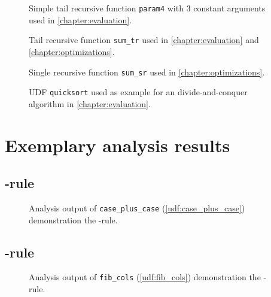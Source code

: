 \begin{figure}[h!]
    \centering
    
    \caption{Simple tail recursive function \texttt{param4} with 3 constant arguments used in \autoref{chapter:evaluation}.}
    \label{udf:param4}
\end{figure}

\begin{figure}[h!]
    \centering
    
    \caption{Tail recursive function \texttt{sum\_tr} used in \autoref{chapter:evaluation} and \autoref{chapter:optimizations}.}
    \label{udf:sum_tr}
\end{figure}

\begin{figure}[h!]
    \centering
    
    \caption{Single recursive function \texttt{sum\_sr} used in \autoref{chapter:optimizations}.}
    \label{udf:sum_sr}
\end{figure}

\begin{figure}[h!]
    \centering
    \caption{UDF \texttt{quicksort} used as example for an divide-and-conquer algorithm in \autoref{chapter:evaluation}.}
    \label{udf:quicksort}
\end{figure}

\FloatBarrier
{}
\section{Exemplary analysis results}\label{appendix:analyzes}
\subsection{{\normalfont\REXPR}-rule}

\begin{figure}[h!]
    \centering
    
    \caption{Analysis output of \texttt{case\_plus\_case} (\autoref{udf:case_plus_case}) demonstration the \REXPR-rule.}
    \label{scenarios:case_plus_case}
\end{figure}

\FloatBarrier
\newpage
\subsection{{\normalfont\RSELECT}-rule}

\begin{figure}[h!]
    \centering
    
    \caption{Analysis output of \texttt{fib\_cols} (\autoref{udf:fib_cols}) demonstration the \RSELECT-rule.}
    \label{scenarios:fib_cols}
\end{figure}
\restoregeometry

